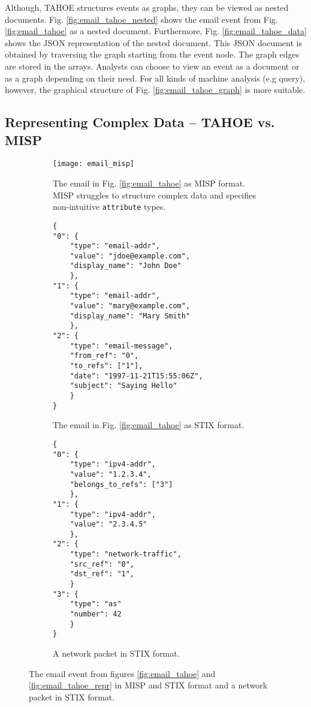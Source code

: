 Although, TAHOE structures events as graphs, they can be viewed as nested documents. Fig. \ref{fig:email_tahoe_nested} shows the email event from Fig. \ref{fig:email_tahoe} as a nested document. Furthermore, Fig. \ref{fig:email_tahoe_data} shows the JSON representation of the nested document. This JSON document is obtained by traversing the graph starting from the event node. The graph edges are stored in the  arrays. Analysts can choose to view an event as a document or as a graph depending on their need. For all kinds of machine analysis (e.g query), however, the graphical structure of Fig. \ref{fig:email_tahoe_graph} is more suitable.



\subsection{Representing Complex Data -- TAHOE vs. MISP}\label{ss:tahoeVmisp}

\begin{figure}[!ht]
\begin{subfigure}{0.35\textwidth}
        \texttt{[image: email\_misp]} %
    	\centering
    	\caption{The email in Fig. \ref{fig:email_tahoe} as MISP format. MISP struggles to structure complex data and specifies non-intuitive \texttt{attribute} types.}
    	\label{fig:email_misp}
\end{subfigure}
\hfill
\captionsetup[subfigure]{aboveskip=-0.5\baselineskip}
\begin{subfigure}{0.32\textwidth}
    \footnotesize
    \begin{verbatim}
{
"0": {
    "type": "email-addr",
    "value": "jdoe@example.com",
    "display_name": "John Doe"
    },
"1": {
    "type": "email-addr",
    "value": "mary@example.com",
    "display_name": "Mary Smith"
    },
"2": {
    "type": "email-message",
    "from_ref": "0",
    "to_refs": ["1"],
    "date": "1997-11-21T15:55:06Z",
    "subject": "Saying Hello"
    }
}
    \end{verbatim}
    \caption{The email in Fig. \ref{fig:email_tahoe} as STIX format.}
    \label{fig:email_stix}
\end{subfigure}
\hfill
\begin{subfigure}{0.3\textwidth}
    \footnotesize
    \begin{verbatim}
{
"0": {
    "type": "ipv4-addr",
    "value": "1.2.3.4",
    "belongs_to_refs": ["3"]
    },
"1": {
    "type": "ipv4-addr",
    "value": "2.3.4.5"
    },
"2": {
    "type": "network-traffic",
    "src_ref": "0",
    "dst_ref": "1",
    }
"3": {
    "type": "as"
    "number": 42
    }
}
    \end{verbatim}
    \caption{A network packet in STIX format.}
    \label{fig:net_stix}
\end{subfigure}
    \caption{The email event from figures \ref{fig:email_tahoe} and \ref{fig:email_tahoe_repr} in MISP and STIX format and a network packet in STIX format.}
\end{figure}


